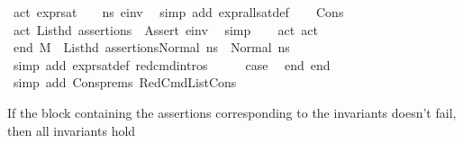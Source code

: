 \begin{isabellebody}
\ act{}{\isacharcolon}{\kern0pt}\ {\isachardoublequoteopen}expr{\isacharunderscore}{\kern0pt}sat\ {\isasymLambda}\ {\isasymGamma}\ {\isasymOmega}\ ns{}\ e{\isacharunderscore}{\kern0pt}inv{\isachardoublequoteclose}\ \isamarkupfalse%
\ {\isacharparenleft}{\kern0pt}simp\ add{\isacharcolon}{\kern0pt}\ expr{\isacharunderscore}{\kern0pt}all{\isacharunderscore}{\kern0pt}sat{\isacharunderscore}{\kern0pt}def{\isacharparenright}{\kern0pt}\isanewline
\ \ \isamarkupfalse%
\ Cons{\isacharparenleft}{\kern0pt}{}{\isacharparenright}{\kern0pt}\ \isamarkupfalse%
\ act{}{\isacharcolon}{\kern0pt}\ {\isachardoublequoteopen}List{\isachardot}{\kern0pt}hd\ assertions\ {\isacharequal}{\kern0pt}\ {\isacharparenleft}{\kern0pt}Assert\ e{\isacharunderscore}{\kern0pt}inv{\isacharparenright}{\kern0pt}{\isachardoublequoteclose}\ \isamarkupfalse%
\ simp\isanewline
\ \ \isamarkupfalse%
\ act{}\ act{}\ \isamarkupfalse%
\ end{}{\isacharcolon}{\kern0pt}\ {\isachardoublequoteopen}M{\isacharcomma}{\kern0pt}{\isasymLambda}{\isacharcomma}{\kern0pt}{\isasymGamma}{\isacharcomma}{\kern0pt}{\isasymOmega}\ {\isasymturnstile}\ {\isasymlangle}List{\isachardot}{\kern0pt}hd\ assertions{\isacharcomma}{\kern0pt}Normal\ ns{}{\isasymrangle}\ {\isasymrightarrow}\ Normal\ ns{}{\isachardoublequoteclose}\ \isanewline
\ \ \ \ \isamarkupfalse%
\ {\isacharparenleft}{\kern0pt}simp\ add{\isacharcolon}{\kern0pt}\ expr{\isacharunderscore}{\kern0pt}sat{\isacharunderscore}{\kern0pt}def\ red{\isacharunderscore}{\kern0pt}cmd{\isachardot}{\kern0pt}intros{\isacharparenleft}{\kern0pt}{}{\isacharparenright}{\kern0pt}{\isacharparenright}{\kern0pt}\isanewline
\isanewline
\ \ \isamarkupfalse%
\ \isamarkupfalse%
\ {\isacharquery}{\kern0pt}case\ \isamarkupfalse%
\ end{}\ end{}\ \isamarkupfalse%
\ {\isacharparenleft}{\kern0pt}simp\ add{\isacharcolon}{\kern0pt}\ Cons{\isachardot}{\kern0pt}prems{\isacharparenleft}{\kern0pt}{}{\isacharparenright}{\kern0pt}\ RedCmdListCons{\isacharparenright}{\kern0pt}\isanewline
{}\isamarkupfalse%
%
\endisatagproof
{\isafoldproof}%
%
\isadelimproof
%
\endisadelimproof
%
\begin{isamarkuptext}%
If the block containing the assertions corresponding to the invariants doesn't fail, then all invariants hold%

\end{isamarkuptext}
\end{isabellebody}
